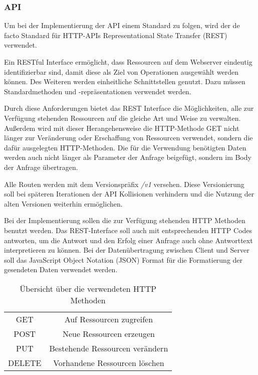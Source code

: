 \subsubsection{API}
Um bei der Implementierung der API einem Standard zu folgen, wird der de facto Standard für HTTP-APIs Representational State Transfer (REST) verwendet.

Ein RESTful Interface ermöglicht, dass Ressourcen auf dem Webserver eindeutig identifizierbar sind, damit diese als Ziel von Operationen ausgewählt werden können. Des Weiteren werden einheitliche Schnittstellen genutzt. Dazu müssen Standardmethoden und -repräsentationen verwendet werden.

Durch diese Anforderungen bietet das REST Interface die Möglichkeiten, alle zur Verfügung stehenden Ressourcen auf die gleiche Art und Weise zu verwalten. Außerdem wird mit dieser Herangehensweise die HTTP-Methode GET nicht länger zur Veränderung oder Erschaffung von Ressourcen verwendet, sondern die dafür ausgelegten HTTP-Methoden. Die für die Verwendung benötigten Daten werden auch nicht länger als Parameter der Anfrage beigefügt, sondern im Body der Anfrage übertragen. \cite{beimsWebApplikationenREST2014}

Alle Routen werden mit dem Versionspräfix \textit{/v1} versehen. Diese Versionierung soll bei späteren Iterationen der API Kollisionen verhindern und die Nutzung der alten Versionen weiterhin ermöglichen. 

Bei der Implementierung sollen die zur Verfügung stehenden HTTP Methoden benutzt werden. Das REST-Interface soll auch mit entsprechenden HTTP Codes antworten, um die Antwort und den Erfolg einer Anfrage auch ohne Antworttext interpretieren zu können. Bei der Datenübertragung zwischen Client und Server soll das JavaScript Object Notation (JSON) Format für die Formatierung der gesendeten Daten verwendet werden.

\begin{table}
	\centering
	\begin{tabular}{c c}
		GET & Auf Ressourcen zugreifen \\ 
		POST & Neue Ressourcen erzeugen \\  
		PUT & Bestehende Ressourcen verändern \\
		DELETE & Vorhandene Ressourcen löschen \\
	\end{tabular}
	\caption{Übersicht über die verwendeten HTTP Methoden}
	\label{table:http-methods}
\end{table}

